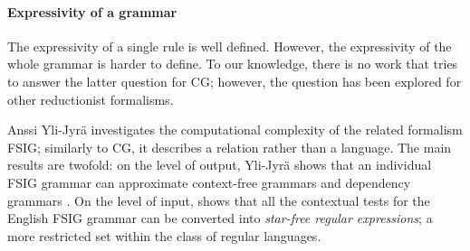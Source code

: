 \paragraph{Expressivity of a grammar}


The expressivity of a single rule is well defined. However, the expressivity of the whole grammar is harder to define. 
%
%
%
To our knowledge, there is no work that tries to answer the latter question for CG; however, the question has been explored for other reductionist formalisms.

Anssi Yli-Jyrä \cite{yli-jyra2005phd} investigates the computational complexity of the related formalism FSIG; similarly to CG, it describes a relation rather than a language. 
%
%
The main results are twofold: on the level of output, Yli-Jyrä shows that an individual FSIG grammar can approximate 
context-free grammars \cite{yli-jyra2003fsig_approx_cfg} 
and dependency grammars \cite{yli-jyra2004fsig_dependency}. 
On the level of input, \cite{yli-jyra2003describing} shows that all the contextual tests for the English FSIG grammar \cite{voutilainen1994designing} can be converted into \emph{star-free regular expressions}; a more restricted set within the class of regular languages.

